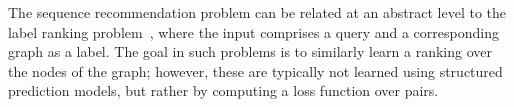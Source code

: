 The sequence recommendation problem can be related at an abstract level to the label ranking problem~\citep{Dekel:2003},
where the input comprises a query and a corresponding graph as a label.
The goal in such problems is to similarly learn a ranking over the nodes of the graph;
however, these are typically not learned using structured prediction models,
but rather by computing a loss function over pairs.

